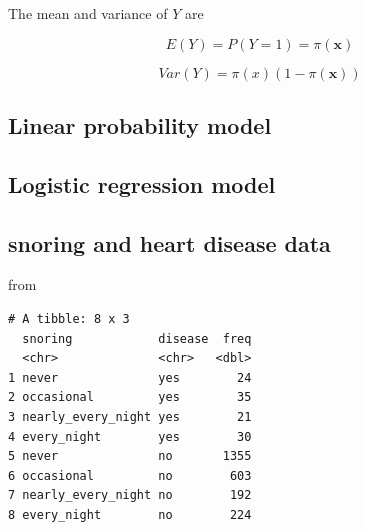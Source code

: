 \documentclass[]{book}
\newenvironment{Shaded}{\begin{snugshade}}{\end{snugshade}}
\newcommand{\DataTypeTok}[1]{\textcolor[rgb]{0.13,0.29,0.53}{#1}}
\newcommand{\DecValTok}[1]{\textcolor[rgb]{0.00,0.00,0.81}{#1}}
\newcommand{\KeywordTok}[1]{\textcolor[rgb]{0.13,0.29,0.53}{\textbf{#1}}}
\newcommand{\NormalTok}[1]{#1}
\newcommand{\OperatorTok}[1]{\textcolor[rgb]{0.81,0.36,0.00}{\textbf{#1}}}
\newcommand{\StringTok}[1]{\textcolor[rgb]{0.31,0.60,0.02}{#1}}
\begin{document}
The mean and variance of \(Y\) are

\[E(Y) = P(Y = 1) = \pi(\mathbf{x})\]

\[Var(Y) = \pi(x)(1 - \pi(\mathbf{x}))\]

\hypertarget{linear-probability-model}{%
\subsection{Linear probability model}\label{linear-probability-model}}

\hypertarget{logistic-regression-model}{%
\subsection{Logistic regression model}\label{logistic-regression-model}}

\hypertarget{snoring-and-heart-disease-data}{%
\subsection{snoring and heart disease data}\label{snoring-and-heart-disease-data}}

from \citet{Agresti:2012aa}

\begin{Shaded}
\end{Shaded}

\begin{verbatim}
# A tibble: 8 x 3
  snoring            disease  freq
  <chr>              <chr>   <dbl>
1 never              yes        24
2 occasional         yes        35
3 nearly_every_night yes        21
4 every_night        yes        30
5 never              no       1355
6 occasional         no        603
7 nearly_every_night no        192
8 every_night        no        224
\end{verbatim}
\end{document}
